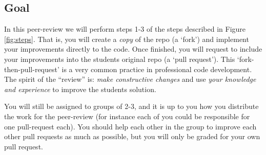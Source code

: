 \documentclass[a4paper]{article}
\begin{document}
\subsection{Goal}
In this peer-review we will perform steps 1-3 of the steps described in Figure \ref{fig:steps}.
That is, you will create a \emph{copy} of the repo (a `fork') and implement your improvements directly to the code. Once finished, you will request to include your improvements into the students original repo (a `pull request'). This `fork-then-pull-request' is a very common practice in professional code development. 
The spirit of the ``review'' is: \emph{make constructive changes} and use \emph{your knowledge and experience} to improve the students solution. 

You will still be assigned to groups of 2-3, and it is up to you how you distribute the work for the peer-review (for instance each of you could be responsible for one pull-request each). You should help each other in the group to improve each other pull requests as much as possible, but you will only be graded for your own pull request. 
\end{document}
